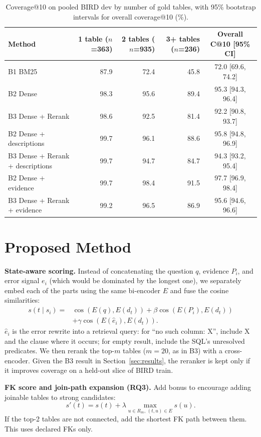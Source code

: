\documentclass[sigconf,nonacm]{acmart}
\begin{document}
\begin{table}[t]
\caption{Coverage@10 on pooled BIRD dev by number of gold tables, with 95\% bootstrap intervals for overall coverage@10 (\%).}
\label{tab:breakdown}
\begin{tabular}{lrrrc}
\toprule
Method & 1 table ($n$=363) & 2 tables ($n$=935) & 3+ tables ($n$=236) & Overall C@10 [95\% CI]\\
\midrule
B1 BM25 & 87.9 & 72.4 & 45.8 & 72.0 [69.6, 74.2]\\
B2 Dense & 98.3 & 95.6 & 89.4 & 95.3 [94.3, 96.4]\\
B3 Dense + Rerank & 98.6 & 92.5 & 81.4 & 92.2 [90.8, 93.7]\\
B2 Dense + descriptions & 99.7 & 96.1 & 88.6 & 95.8 [94.8, 96.9]\\
B3 Dense + Rerank + descriptions & 99.7 & 94.7 & 84.7 & 94.3 [93.2, 95.4]\\
B2 Dense + evidence & 99.7 & 98.4 & 91.5 & 97.7 [96.9, 98.4]\\
B3 Dense + Rerank + evidence & 99.2 & 96.5 & 86.9 & 95.6 [94.6, 96.6]\\
\bottomrule
\end{tabular}
\end{table}

\section{Proposed Method}

\textbf{State-aware scoring.} Instead of concatenating the question $q$, evidence $P_i$, and error signal $e_i$ (which would be dominated by the longest one), we separately embed each of the parts using the same bi-encoder $E$ and fuse the cosine similarities:
\begin{equation}
\begin{split}
s(t\mid s_i)={}&\cos(E(q),E(d_t))+\beta\cos(E(P_i),E(d_t))\\
&+\gamma\cos(E(\hat e_i),E(d_t)).
\end{split}
\end{equation}
$\hat e_i$ is the error rewrite into a retrieval query: for ``no such column: X'', include X and the clause where it occurs; for empty result, include the SQL's unresolved predicates. We then rerank the top-$m$ tables ($m=20$, as in B3) with a cross-encoder. Given the B3 result in Section~\ref{sec:results}, the reranker is kept only if it improves coverage on a held-out slice of BIRD train.

\textbf{FK score and join-path expansion (RQ3).} Add bonus to encourage adding joinable tables to strong candidates:
\begin{equation}
s'(t)=s(t)+\lambda\max_{u\in R_m,\,(t,u)\in E} s(u).
\end{equation}
If the top-2 tables are not connected, add the shortest FK path between them. This uses declared FKs only.
\end{document}
